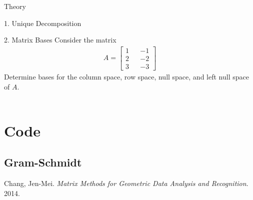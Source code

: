 \begin{section}{Theory}

\begin{homeworkSection}{1. Unique Decomposition}

\problemAnswer{
}

\end{homeworkSection}

\begin{homeworkSection}{2. Matrix Bases}
Consider the matrix
\begin{align*}
    A = \begin{bmatrix} 1 && -1 \\ 2 && -2 \\ 3 && -3 \end{bmatrix}
\end{align*}
Determine bases for the column space, row space, null space, and left null space of $A$.
\\
\\

\problemAnswer{ 
}

\end{homeworkSection}

\end{section}


\newpage

\appendix

\section{Code}\label{code}

\subsection{Gram-Schmidt} \label{code:gram_schmidt}




\begin{thebibliography}{10}
    Chang, Jen-Mei. \textit{Matrix Methods for Geometric Data Analysis and Recognition}. 2014.

\end{thebibliography}


